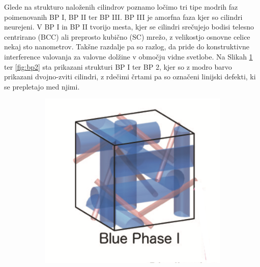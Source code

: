\documentclass[longbibliography,slovene,a4paper,12pt]{book}
\begin{document}
 Glede na strukturo naloženih cilindrov poznamo ločimo tri tipe modrih faz poimenovanih BP I, BP II ter BP III. BP III je amorfna faza kjer so cilindri neurejeni. V BP I in BP II tvorijo mesta, kjer se cilindri srečujejo  bodisi telesno centrirano (BCC) ali preprosto kubično (SC) mrežo, z velikostjo osnovne celice nekaj sto nanometrov. Takšne razdalje pa so razlog, da pride do konstruktivne interference valovanja za valovne dolžine v območju vidne svetlobe. Na Slikah \ref{fig:bp1} ter \ref{fig:bp2} sta prikazani strukturi BP I ter BP 2, kjer so z modro barvo prikazani dvojno-zviti cilindri, z rdečimi črtami pa so označeni linijski defekti, ki se prepletajo med njimi.\\
 
 \begin{figure}[h!]
	\centering
	\begin{subfigure}[b]{0.45\textwidth}
	\includegraphics[width=\textwidth]{slike/bp_I.png}
	\label{fig:bp1}
	\end{subfigure}
	\begin{subfigure}[b]{0.45\textwidth}

\end{subfigure}
\end{figure}
\end{document}
